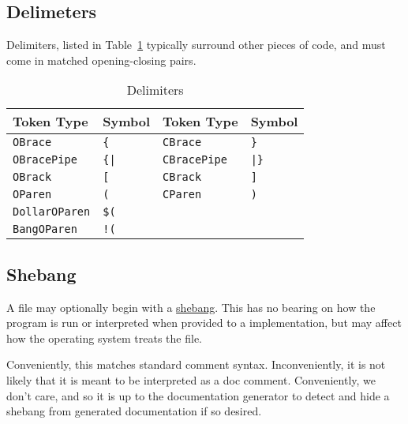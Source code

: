 \subsection{Delimeters}

Delimiters, listed in Table~\ref{tab:delimiters} typically surround other
pieces of code, and must come in matched opening-closing pairs.

\begin{table}[h]
    \centering
    \begin{tabular}[t]{llll}
        \hline
        \textbf{Token Type} & \textbf{Symbol}& \textbf{Token Type} & \textbf{Symbol} \\
        \hline
        \texttt{OBrace} & \texttt{\{}& \texttt{CBrace} & \texttt{\}} \\
        \texttt{OBracePipe} & \texttt{\{|}& \texttt{CBracePipe} & \texttt{|\}} \\
        \texttt{OBrack} & \texttt{[} & \texttt{CBrack} & \texttt{]} \\
        \texttt{OParen} & \texttt{(} & \texttt{CParen} & \texttt{)} \\
        \texttt{DollarOParen} & \texttt{\$(} & & \\ %
        \texttt{BangOParen} & \texttt{!(} & & \\
        \hline
    \end{tabular}
    \caption{\label{tab:delimiters}Delimiters}
\end{table}

\FloatBarrier
\subsection{Shebang}

A \Trilogy{} file may optionally begin with a
\href{https://en.wikipedia.org/wiki/Shebang_(Unix)}{shebang}. This has no bearing
on how the program is run or interpreted when provided to a \Trilogy{} implementation,
but may affect how the operating system treats the file.

Conveniently, this matches standard comment syntax. Inconveniently, it is not
likely that it is meant to be interpreted as a doc comment. Conveniently,
we don't care, and so it is up to the documentation generator to detect and
hide a shebang from generated documentation if so desired.
